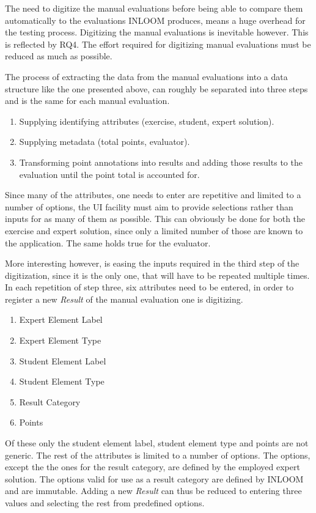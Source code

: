 The need to digitize the manual evaluations before being able to compare them automatically
to the evaluations INLOOM produces, means a huge overhead for the testing process. 
Digitizing the manual evaluations is inevitable however. This is reflected by RQ4.
The effort required for digitizing manual evaluations must be reduced as much as possible.

The process of extracting the data from the manual evaluations into a data structure like the 
one presented above, can roughly be separated into three steps and is the same for each manual
evaluation.

\begin{enumerate}
    \item Supplying identifying attributes (exercise, student, expert solution).
    \item Supplying metadata (total points, evaluator).
    \item Transforming point annotations into results and adding those results to the evaluation
    until the point total is accounted for.
\end{enumerate}

Since many of the attributes, one needs to enter are repetitive and limited to a number of options,
the UI facility must aim to provide selections rather than inputs for as many of them as
possible. This can obviously be done for both the exercise and expert solution, since only a 
limited number of those are known to the application. The same holds true for the evaluator.

More interesting however, is easing the inputs required in the third step of the digitization, 
since it is the only one, that will have to be repeated multiple times. In each repetition of 
step three, six attributes need to be entered, in order to register a new \textit{Result} of 
the manual evaluation one is digitizing.  

\begin{enumerate}
    \item Expert Element Label
    \item Expert Element Type
    \item Student Element Label
    \item Student Element Type
    \item Result Category
    \item Points
\end{enumerate}

Of these only the student element label, student element type and points are not generic. The
rest of the attributes is limited to a number of options. The options, except the the ones 
for the result category, are defined by the employed expert solution. The options valid for 
use as a result category are defined by INLOOM and are immutable. Adding a new \textit{Result}
can thus be reduced to entering three values and selecting the rest from predefined options.



